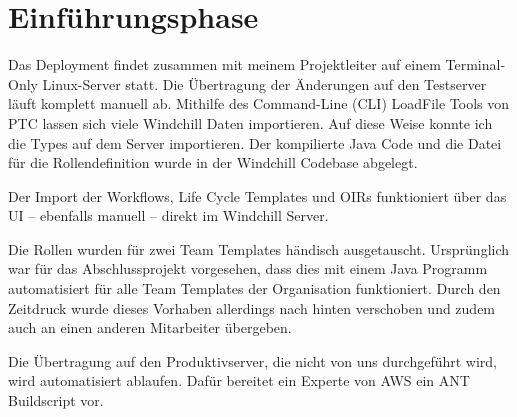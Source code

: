 \section{Einführungsphase}
\label{sec:Einfuehrungsphase}

Das Deployment findet zusammen mit meinem Projektleiter auf einem Terminal-Only Linux-Server statt.
Die Übertragung der Änderungen auf den Testserver läuft komplett manuell ab.
Mithilfe des Command-Line (CLI) LoadFile Tools von PTC lassen sich viele Windchill Daten importieren.
Auf diese Weise konnte ich die Types auf dem Server importieren.
Der kompilierte Java Code und die Datei für die Rollendefinition wurde in der Windchill Codebase abgelegt.

Der Import der Workflows, Life Cycle Templates und OIRs funktioniert über das UI -- ebenfalls manuell -- direkt im Windchill Server.

Die Rollen wurden für zwei Team Templates händisch ausgetauscht.
Ursprünglich war für das Abschlussprojekt vorgesehen, dass dies mit einem Java Programm automatisiert für alle Team Templates der Organisation funktioniert.
Durch den Zeitdruck wurde dieses Vorhaben allerdings nach hinten verschoben und zudem auch an einen anderen Mitarbeiter übergeben.

Die Übertragung auf den Produktivserver, die nicht von uns durchgeführt wird, wird automatisiert ablaufen.
Dafür bereitet ein Experte von AWS ein ANT Buildscript vor.

